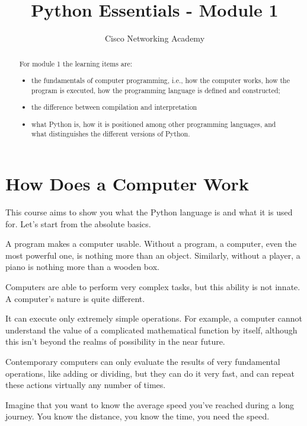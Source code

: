 \documentclass[a4paper,10pt]{article}
\title{Python Essentials - Module 1}
\author{Cisco Networking Academy}
\begin{document}
\maketitle{}
\begin{abstract}
For module 1 the learning items are:
\begin{itemize}
    \item the fundamentals of computer programming, i.e., how the computer works, how the program is executed, how the programming language is defined and constructed;
    \item the difference between compilation and interpretation
    \item what Python is, how it is positioned among other programming languages, and what distinguishes the different versions of Python.
\end{itemize}
\end{abstract}

\section{How Does a Computer Work}
This course aims to show you what the Python language is and what it is used for. Let's start from the absolute basics.
\newline

A program makes a computer usable. Without a program, a computer, even the most powerful one, is nothing more than an object. Similarly, without a player, a piano is nothing more than a wooden box.
\newline

Computers are able to perform very complex tasks, but this ability is not innate. A computer's nature is quite different.
\newline

It can execute only extremely simple operations. For example, a computer cannot understand the value of a complicated mathematical function by itself, although this isn't beyond the realms of possibility in the near future.
\newline

Contemporary computers can only evaluate the results of very fundamental operations, like adding or dividing, but they can do it very fast, and can repeat these actions virtually any number of times.
\newline

Imagine that you want to know the average speed you've reached during a long journey. You know the distance, you know the time, you need the speed.
\newline
\end{document}
